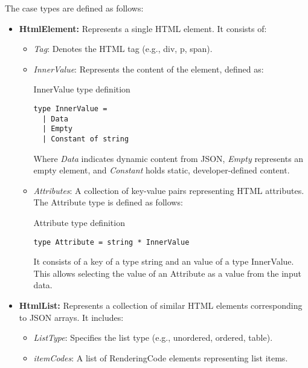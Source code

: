 The case types are defined as follows:
\begin{itemize}
	\item \textbf{HtmlElement:} Represents a single HTML element. It consists of:
	      \begin{itemize}
		      \item \emph{Tag}: Denotes the HTML tag (e.g., div, p, span).

		      \item \emph{InnerValue}: Represents the content of the element, defined as:
		            \begin{listing}[H]
			            \caption{InnerValue type definition}
			            \begin{lstlisting}type InnerValue =
  | Data 
  | Empty
  | Constant of string  

                  \end{lstlisting}
		            \end{listing}
		            Where \emph{Data} indicates dynamic content from JSON, \emph{Empty} represents an empty element, and \emph{Constant} holds static, developer-defined content.
		      \item {\emph{Attributes}: A collection of key-value pairs representing HTML attributes.
		            The Attribute type is defined as follows:
		            \begin{listing}[H]
			            \caption {Attribute type definition}
			            \begin{lstlisting}
type Attribute = string * InnerValue
              \end{lstlisting}
		            \end{listing}
		            It consists of a key of a type string and an value of a type InnerValue. This allows selecting the value of an Attribute as a value from the input data.
		            }

	      \end{itemize}	\item \textbf{HtmlList:} Represents a collection of similar HTML elements corresponding to JSON arrays. It includes:
	      \begin{itemize}
		      \item \emph{ListType}: Specifies the list type (e.g., unordered, ordered, table).
		      \item \emph{itemCodes}: A list of RenderingCode elements representing list items.


\end{itemize}
\end{itemize}
